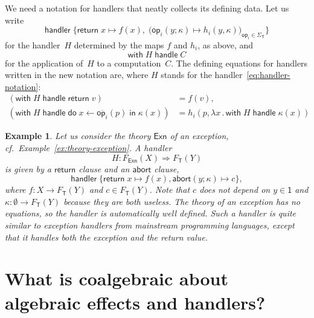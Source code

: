 \documentclass{amsart}
\newcommand{\theory}[1]{\mathsf{#1}} %
\newcommand{\signature}[1]{\Sigma_{\theory{#1}}} %
\newcommand{\Free}[2]{F_{\theory{#1}}(#2)} %
\newcommand{\lam}[1]{\lambda #1 \,.\,}
\newcommand{\op}[1]{\mathsf{op}_{#1}} %
\newcommand{\one}{\mathsf{1}} %
\newcommand{\hto}{\Rightarrow} %
\newcommand{\kode}[1]{\mathsf{#1}}
\newcommand{\seq}[2]{\kode{do}\; #1 \leftarrow #2 \;\kode{in}\;}
\newcommand{\handler}{\kode{handler}\;}
\newcommand{\xopgen}[2]{\overline{#1}(#2)}
\newcommand{\opclause}[3]{#1(#2; #3) \mapsto}
\newcommand{\return}[1]{\kode{return}\;#1}
\newcommand{\retclause}[1]{\return{#1} \mapsto}
\newcommand{\withhandle}[2]{\kode{with}\; #1\; \kode{handle}\; #2}
\newtheorem{example}{Example}[section]
\begin{document}
We need a notation for handlers that neatly collects its defining data. Let us write
%
\begin{equation}
  \label{eq:handler-notation}
  \handler \{
    \retclause{x} f(x), \;
    \big( \opclause{\op{i}}{y}{\kappa} h_i(y, \kappa) \big)_{\op{i} \in \signature{T}}
  \}
\end{equation}
%
for the handler~$H$ determined by the maps $f$ and $h_i$, as above, and
%
\begin{equation*}
  \withhandle{H}{C}
\end{equation*}
%
for the application of~$H$ to a computation~$C$. The defining equations for
handlers written in the new notation are, where $H$ stands for the
handler~\eqref{eq:handler-notation}:
%
\begin{align*}
  (\withhandle{H}{\return v}) &= f(v), \\
  (\withhandle{H}{\seq{x}{\xopgen{\op{i}}{p}} \kappa(x)}) &=
  h_i (p, \lam{x} \withhandle{H}{\kappa(x)})
\end{align*}

\begin{example}
  Let us consider the theory $\theory{Exn}$ of an exception, cf.\
  Example~\ref{ex:theory-exception}. A handler
  \begin{equation*}
    H : \Free{Exn}{X} \hto \Free{T}{Y}
  \end{equation*}
  is given by a $\kode{return}$ clause and an $\kode{abort}$ clause,
  \begin{equation*}
    \handler \{
      \retclause{x} f(x),
      \opclause{\kode{abort}}{y}{\kappa} c
    \},
  \end{equation*}
  where $f : X \to \Free{T}{Y}$ and $c \in \Free{T}{Y}$. Note that $c$ does not
  depend on $y \in \one$ and $\kappa : \emptyset \to \Free{T}{Y}$ because they
  are both useless. The theory of an exception has no equations, so the
  handler is automatically well defined. Such a handler is quite similar to
  exception handlers from mainstream programming languages, except that it
  handles both the exception and the return value.
\end{example}

\section{What is coalgebraic about algebraic effects and handlers?}
\label{sec:what-coalg-about}
\end{document}
